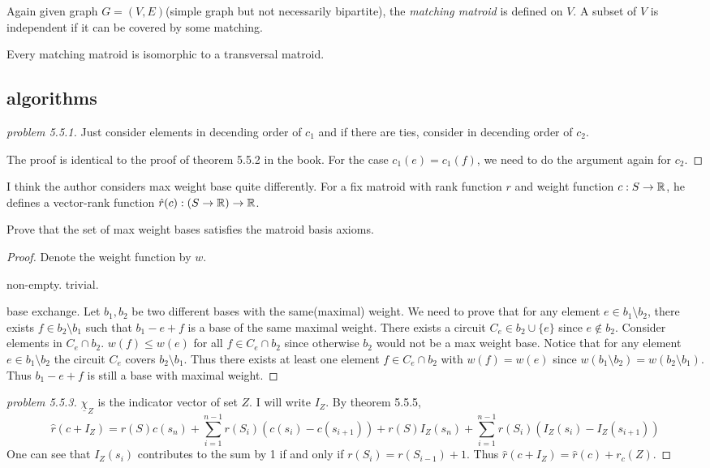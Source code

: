 Again given graph $G=(V,E)$(simple graph but not necessarily bipartite), the \emph{matching matroid} is defined on $V$. A subset of $V$ is independent if it can be covered by some matching. 

Every matching matroid is isomorphic to a transversal matroid.

\subsection{algorithms}
\begin{proof}[problem 5.5.1]
    Just consider elements in decending order of $c_1$ and if there are ties, consider in decending order of $c_2$.

    The proof is identical to the proof of theorem 5.5.2 in the book. For the case $c_1(e)=c_1(f)$, we need to do the argument again for $c_2$.
\end{proof}

I think the author considers max weight base quite differently. For a fix matroid with rank function $r$ and weight function $c:S\to \R$, he defines a vector-rank function $\hat{r}(c):(S\to \R )\to \R$.

\begin{nproblem}[5.5.2]
    Prove that the set of max weight bases satisfies the matroid basis axioms.
\end{nproblem}
\begin{proof}
    Denote the weight function by $w$.

    non-empty. trivial.

    base exchange. Let $b_1,b_2$ be two different bases with the same(maximal) weight. We need to prove that for any element $e\in b_1\setminus b_2$, there exists $f\in b_2\setminus b_1$ such that $b_1-e+f$ is a base of the same maximal weight. There exists a circuit $C_e\in b_2\cup\{e\}$ since $e\notin b_2$. Consider elements in $C_e\cap b_2$. $w(f)\leq w(e)$ for all $f\in C_e\cap b_2$ since otherwise $b_2$ would not be a max weight base. Notice that for any element $e\in b_1\setminus b_2$ the circuit $C_e$ covers $b_2\setminus b_1$. Thus there exists at least one element $f\in C_e\cap b_2$ with $w(f)=w(e)$ since $w(b_1\setminus b_2)=w(b_2\setminus b_1)$. Thus $b_1-e+f$ is still a base with maximal weight.
\end{proof}

\begin{proof}[problem 5.5.3]
    $\underline{\chi}_{Z}$ is the indicator vector of set $Z$. I will write $I_Z$. By theorem 5.5.5, 
    \[
        \hat{r}(c+I_Z)=r(S)c(s_n)+\sum_{i=1}^{n-1} r(S_i)\left( c(s_i)-c(s_{i+1})\right)+r(S)I_Z(s_n)+\sum_{i=1}^{n-1} r(S_i)\left( I_Z(s_i)-I_Z(s_{i+1})\right)
    \]
    One can see that $I_Z(s_i)$ contributes to the sum by 1 if and only if $r(S_i)=r(S_{i-1})+1$. Thus $\hat{r}(c+I_Z)=\hat r(c)+r_c(Z)$.

\end{proof}

